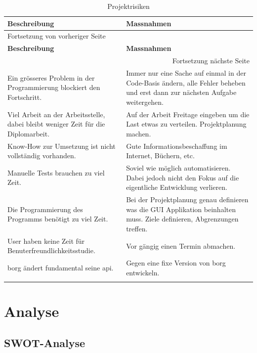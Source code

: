 \begin{longtable}{|p{}|p{}|}
\hline
\textbf{Beschreibung}\cellcolor[HTML]{C0C0C0} & \textbf{Massnahmen}\cellcolor[HTML]{C0C0C0}\\
\hline
\endfirsthead
\multicolumn{2}{l}{Fortsetzung von vorheriger Seite} \\
\hline

\textbf{Beschreibung}\cellcolor[HTML]{C0C0C0} & \textbf{Massnahmen}\cellcolor[HTML]{C0C0C0} \\

\hline
\endhead
\hline\multicolumn{2}{r}{Fortsetzung nächste Seite} \\
\endfoot
\endlastfoot
\hline
Ein grösseres Problem in der Programmierung blockiert den Fortschritt. & Immer nur eine Sache auf einmal in der Code-Basis ändern, alle Fehler beheben und erst dann zur nächsten Aufgabe weitergehen.\\
\hline
Viel Arbeit an der Arbeitsstelle, dabei bleibt weniger Zeit für die Diplomarbeit. & Auf der Arbeit Freitage eingeben um die Last etwas zu verteilen. Projektplanung machen.\\
\hline
Know-How zur Umsetzung ist nicht vollständig vorhanden. & Gute Informationsbeschaffung im Internet, Büchern, etc.\\
\hline
Manuelle Tests brauchen zu viel Zeit. & Soviel wie möglich automatisieren. Dabei jedoch nicht den Fokus auf die eigentliche Entwicklung verlieren.\\
\hline
Die Programmierung des Programms benötigt zu viel Zeit. & Bei der Projektplanung genau definieren was die GUI Applikation beinhalten muss. Ziele definieren, Abgrenzungen treffen.\\
\hline
User haben keine Zeit für Benuterfreundlichkeitsstudie. & Vor gängig einen Termin abmachen.\\
\hline
\gls{borg} ändert fundamental seine \gls{api}. & Gegen eine fixe Version von \gls{borg} entwickeln.\\
\hline
\caption{\label{tab:orge8eb370}
Projektrisiken}
\\
\end{longtable}

\cleardoublepage
\section{Analyse}
\label{sec:org61eed6c}
\subsection{SWOT-Analyse}
\label{sec:orgd8cfd66}

